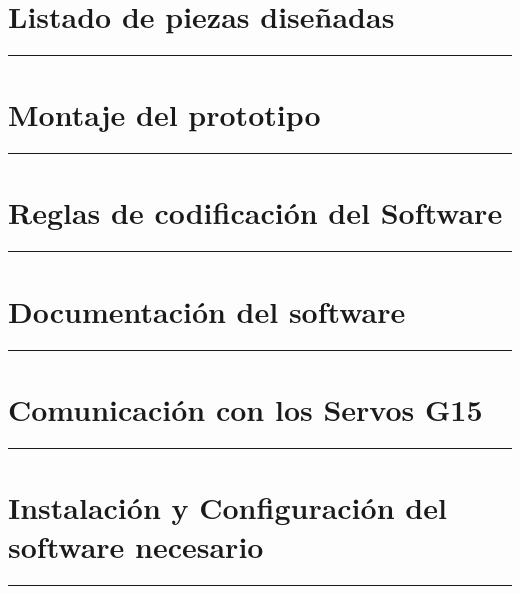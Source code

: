 \appendix
{}


     \chapter{Listado de piezas diseñadas} \label{app:listadoPiezas}
         \hrule
         \vspace{3mm}
     	 
    	
     \chapter{Montaje del prototipo} \label{app:montajePiezas}
         \hrule
         \vspace{3mm}
         
    	
     \chapter{Reglas de codificación del Software} \label{app:codificacionSW}
        \hrule
        \vspace{3mm}
     	
    
     \chapter{Documentación del software} \label{app:documentacion_software}
         \hrule
         \vspace{3mm}
     	 
     	 
     \chapter{Comunicación con los Servos G15} \label{app:registros_g15}
	     \hrule
	     \vspace{3mm}
	     
	      

     \chapter{Instalación y Configuración del software necesario} \label{app:instalacion_software}
         \hrule
         \vspace{3mm}
         
         
        
